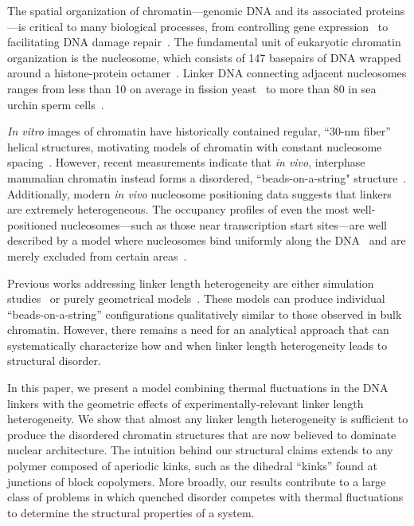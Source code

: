 \documentclass[%
 reprint,
superscriptaddress,
showpacs,preprintnumbers,
 amsmath,amssymb,
 aps,
 prl,
floatfix,
]{revtex4-1}
\begin{document}

The spatial organization of chromatin---genomic DNA and its associated proteins---is critical
    to many biological processes, from controlling gene expression~\cite{hubner2013}
    to facilitating DNA damage repair~\cite{hauer2017,stadler2017}.
The fundamental unit of eukaryotic chromatin organization is the
    nucleosome, which consists of 147 basepairs of DNA wrapped around a histone-protein
    octamer~\cite{cutter2015a}.
Linker DNA connecting adjacent nucleosomes ranges from less than \SI{10}{\basepair} on
    average in fission yeast~\cite{givens2012} to more than \SI{80}{\basepair} in sea urchin sperm cells~\cite{spadafora1976}.

\textit{In vitro} images of chromatin have historically contained regular, ``30-nm fiber'' helical structures, motivating
models of chromatin with constant nucleosome spacing~\cite{%
    grigoryev2016,kepper2008, ben2001,
    koslover2010,langowski2007,muller2014,schiessel2001,scipioni2010,wedemann2002,bascom2018,koslover2013a}.
However, recent measurements indicate that \textit{in vivo}, interphase mammalian chromatin instead forms a disordered, ``beads-on-a-string" structure~\cite{ou2017, ricci2015, nozaki2017}.
Additionally, modern \textit{in vivo} nucleosome positioning data suggests that linkers are extremely heterogeneous.
The occupancy profiles of even the most well-positioned nucleosomes---such as those near
    transcription start sites---are well described by a model where nucleosomes bind
    uniformly along the DNA~\cite{kornberg1988, chevereau2009, chereji2011,
    beshnova2014, chou2007, kornberg1981, mavrich2008, mobius2010, mobius2013,
    teif2010, tesoro2016, muller2014%
    } and are merely excluded from certain areas~\cite{ozonov2013}.

Previous works addressing linker length heterogeneity are either simulation studies~\cite{collepardo-guevara2014, bascom2017a} or purely geometrical models~\cite{grigoryev1981, woodcock1993}.
These models can produce individual ``beads-on-a-string'' configurations qualitatively similar to those observed in bulk chromatin.
However, there remains a need for an analytical approach that can systematically characterize how and when linker length heterogeneity leads to structural disorder.

In this paper, we present a model combining thermal fluctuations in the DNA
linkers with the geometric effects of experimentally-relevant linker length heterogeneity.
We show that almost any linker length heterogeneity is sufficient to produce the disordered chromatin structures that are now believed to dominate nuclear architecture.
The intuition behind our structural claims extends to any polymer composed of
    aperiodic kinks, such as the dihedral ``kinks'' found at junctions of
    block copolymers.
More broadly, our results contribute to a large class of problems in which quenched
    disorder competes with thermal fluctuations to determine the structural
    properties of a system.
\end{document}
